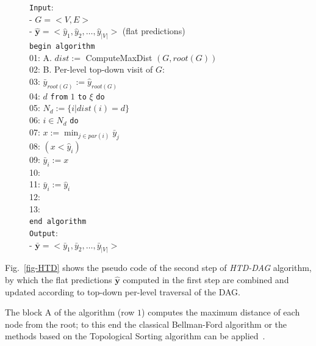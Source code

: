 \documentclass{bioinfo}
\newcommand{\inda}{\phantom{1}\hspace{3mm}}
\newcommand{\indb}{\phantom{1}\hspace{8.5mm}}
\newcommand{\indc}{\phantom{1}\hspace{12mm}}
\newcommand{\indd}{\phantom{1}\hspace{16mm}}
\newcommand{\inde}{\phantom{1}\hspace{20mm}}
\newcommand{\by}{\boldsymbol{y}}
\begin{document}
\begin{methods}
\begin{figure}[!hb]
\begin{center}
{\begin{minipage}{0.40\textwidth}
\noindent
{\tt Input}:\\
- $G = <V,E>$\\
- $\hat{\by} = < \hat{y}_1, \hat{y}_2, \ldots, \hat{y}_{|V|}>$ (flat predictions) \\
\noindent
{\tt begin algorithm}\\
01:  \inda   A. $dist := $ ComputeMaxDist $(G, root(G))$ \\
02:  \inda   B. Per-level top-down visit of $G$:\\
03:    \indb $\bar{y}_{root(G)} := \hat{y}_{root(G)}$\\
04:    \indb {\tt for each} $d$ {\tt from} $1$ {\tt to} $\xi$ {\tt do}\\
05:      \indc  $N_d := \{ i | dist(i) = d \}$\\
06:      \indc  {\tt for each} $i \in N_d$ {\tt do}\\
07:          \indd  $x := \min_{j \in par(i)} \bar{y}_j$\\
08:          \indd  {\tt if} $(x < \hat{y}_i)$\\
09:             \inde  $\bar{y}_i := x$\\
10:          \indd  {\tt else}\\
11:             \inde  $\bar{y}_i := \hat{y}_i$\\
12:      \indc  {\tt end for}\\
13:    \indb {\tt end for}\\
{\tt end algorithm}\\
\noindent
{\tt Output}:\\
- $\bar{\by} = < \bar{y}_1, \bar{y}_2, \ldots, \bar{y}_{|V|}>$\\
\end{minipage}
}
\end{center}
\end{figure}



Fig.~\ref{fig-HTD} shows the pseudo code of the second step of {\em HTD-DAG} algorithm, by which the flat predictions $\hat{\by}$ computed in the first step are combined and updated according to top-down per-level traversal of the DAG.

The block A of the algorithm (row  $1$) computes the maximum distance of each node from the root; to this end the classical Bellman-Ford algorithm or the methods based on the Topological Sorting algorithm can be applied~\cite{Cormen09}.


\end{methods}
\end{document}
